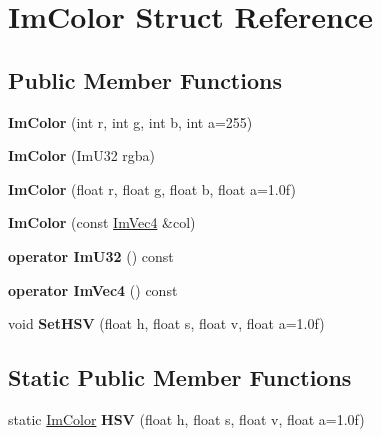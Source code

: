 \hypertarget{struct_im_color}{}\section{Im\+Color Struct Reference}
\label{struct_im_color}
\subsection*{Public Member Functions}
\begin{DoxyCompactItemize}
\item 
\mbox{\label{struct_im_color_ab4ba02f8290d5dadc1ebc57b2c8a9cbe}} 
{\bfseries Im\+Color} (int r, int g, int b, int a=255)
\item 
\mbox{\label{struct_im_color_ad306332841a2b1f903f40262a19f9412}} 
{\bfseries Im\+Color} (Im\+U32 rgba)
\item 
\mbox{\label{struct_im_color_a92b53917ca9d90a7207b18270ff5453d}} 
{\bfseries Im\+Color} (float r, float g, float b, float a=1.\+0f)
\item 
\mbox{\label{struct_im_color_aa5306926b3ef766a8647b26bdfd9f8d2}} 
{\bfseries Im\+Color} (const \mbox{\hyperlink{struct_im_vec4}{Im\+Vec4}} \&col)
\item 
\mbox{\label{struct_im_color_a4f4fc53e0676d50404d6d5ffcf16637f}} 
{\bfseries operator Im\+U32} () const
\item 
\mbox{\label{struct_im_color_a10f1de242f13c93f8be64545e4cbcb0a}} 
{\bfseries operator Im\+Vec4} () const
\item 
\mbox{\label{struct_im_color_afcff20160db703b956d56e5a9fa88e24}} 
void {\bfseries Set\+H\+SV} (float h, float s, float v, float a=1.\+0f)
\end{DoxyCompactItemize}
\subsection*{Static Public Member Functions}
\begin{DoxyCompactItemize}
\item 
\mbox{\label{struct_im_color_ac8cb52119648523038818a613becf010}} 
static \mbox{\hyperlink{struct_im_color}{Im\+Color}} {\bfseries H\+SV} (float h, float s, float v, float a=1.\+0f)
\end{DoxyCompactItemize}

